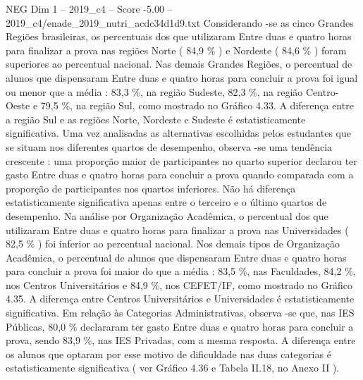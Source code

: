 \begin{textsample}{NEG Dim 1 – 2019\_c4 – Score -5.00 – 2019\_c4/enade\_2019\_nutri\_acdc34d1d9.txt}
Considerando -se as cinco Grandes Regiões brasileiras, os percentuais dos que utilizaram Entre duas e quatro horas para finalizar a prova nas regiões Norte ( 84,9 \% ) e Nordeste ( 84,6 \% ) foram superiores ao percentual nacional.
Nas demais Grandes Regiões, o percentual de alunos que dispensaram Entre duas e quatro horas para concluir a prova foi igual ou menor que a média : 83,3 \%, na região Sudeste, 82,3 \%, na região Centro-Oeste e 79,5 \%, na região Sul, como mostrado no Gráfico 4.33.
A diferença entre a região Sul e as regiões Norte, Nordeste e Sudeste é estatisticamente significativa.
Uma vez analisadas as alternativas escolhidas pelos estudantes que se situam nos diferentes quartos de desempenho, observa -se uma tendência crescente : uma proporção maior de participantes no quarto superior declarou ter gasto Entre duas e quatro horas para concluir a prova quando comparada com a proporção de participantes nos quartos inferiores.
Não há diferença estatisticamente significativa apenas entre o terceiro e o último quartos de desempenho.
Na análise por Organização Acadêmica, o percentual dos que utilizaram Entre duas e quatro horas para finalizar a prova nas Universidades ( 82,5 \% ) foi inferior ao percentual nacional.
Nos demais tipos de Organização Acadêmica, o percentual de alunos que dispensaram Entre duas e quatro horas para concluir a prova foi maior do que a média : 83,5 \%, nas Faculdades, 84,2 \%, nos Centros Universitários e 84,9 \%, nos CEFET/IF, como mostrado no Gráfico 4.35.
A diferença entre Centros Universitários e Universidades é estatisticamente significativa.
Em relação às Categorias Administrativas, observa -se que, nas IES Públicas, 80,0 \% declararam ter gasto Entre duas e quatro horas para concluir a prova, sendo 83,9 \%, nas IES Privadas, com a mesma resposta.
A diferença entre os alunos que optaram por esse motivo de dificuldade nas duas categorias é estatisticamente significativa ( ver Gráfico 4.36 e Tabela II.18, no Anexo II ).

\end{textsample}
